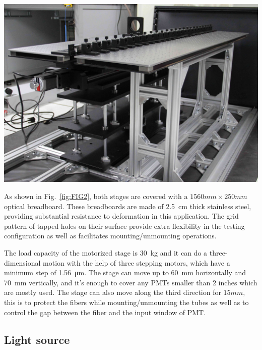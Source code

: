\documentclass[a4paper,10pt,twoside]{cpc-hepnp}
\begin{document}
\begin{multicols}{2}
\begin{center}
	\includegraphics[width=\linewidth]{FIG2}
\end{center} 

As shown in Fig.~\ref{fig:FIG2}, both stages are covered with a $1560mm\times250mm$ optical breadboard. 
These breadboards are made of \SI{2.5}{cm} thick stainless steel, providing substantial resistance to deformation in this application. 
The grid pattern of tapped holes on their surface provide extra flexibility in the testing configuration as well as facilitates mounting/unmounting operations.

The load capacity of the motorized stage is \SI{30}{\kilo\gram} and it can do a three-dimensional motion with the help of three stepping motors, which have a minimum step of \SI{1.56}{\micro\meter}.
The stage can move up to \SI{60}{\milli\meter} horizontally and \SI{70}{\milli\meter} vertically, and it's enough to cover any PMTs smaller than 2 inches which are mostly used.
The stage can also move along the third direction for $15mm$, this is to protect the fibers while mounting/unmounting the tubes as well as to control the gap between the fiber and the input window of PMT.

\subsection{Light source}
\label{sec:light_source}


\end{multicols}
\end{document}

